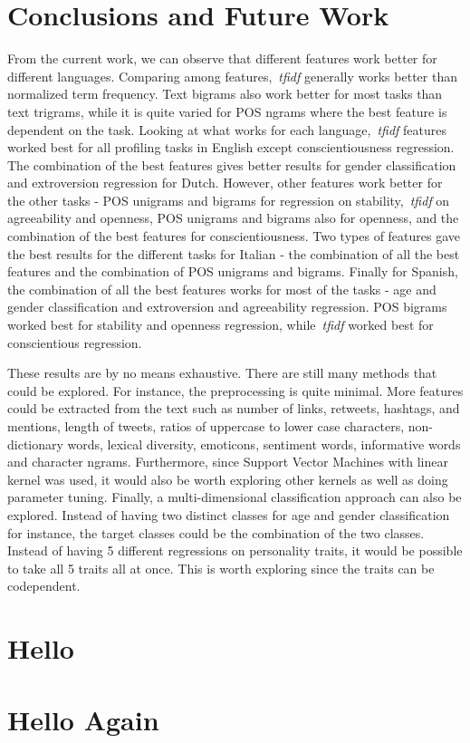 \documentclass[a4paper]{llncs}
\begin{document}
\section{Conclusions and Future Work}
From the current work, we can observe that different features work better for different languages. Comparing among features,~\textit{tfidf} generally works better than normalized term frequency. Text bigrams also work better for most tasks than text trigrams, while it is quite varied for POS ngrams where the best feature is dependent on the task. Looking at what works for each language,~\textit{tfidf} features worked best for all profiling tasks in English except conscientiousness regression. The combination of the best features gives better results for gender classification and extroversion regression for Dutch. However, other features work better for the other tasks - POS unigrams and bigrams for regression on stability,~\textit{tfidf} on agreeability and openness, POS unigrams and bigrams also for openness, and the combination of the best features for conscientiousness. Two types of features gave the best results for the different tasks for Italian - the combination of all the best features and the combination of POS unigrams and bigrams. Finally for Spanish, the combination of all the best features works for most of the tasks - age and gender classification and extroversion and agreeability regression. POS bigrams worked best for stability and openness regression, while~\textit{tfidf} worked best for conscientious regression.

These results are by no means exhaustive. There are still many methods that could be explored. For instance, the preprocessing is quite minimal. More features could be extracted from the text such as number of links, retweets, hashtags, and mentions, length of tweets, ratios of uppercase to lower case characters, non-dictionary words, lexical diversity, emoticons, sentiment words, informative words and character ngrams. Furthermore, since Support Vector Machines with linear kernel was used, it would also be worth exploring other kernels as well as doing parameter tuning. Finally, a multi-dimensional classification approach can also be explored. Instead of having two distinct classes for age and gender classification for instance, the target classes could be the combination of the two classes. Instead of having 5 different regressions on personality traits, it would be possible to take all 5 traits all at once. This is worth exploring since the traits can be codependent. 


\begin{appendices}
\renewcommand{\thesection}{\appendixname~\Alph{section}}
\section{Hello}
\section{Hello Again}
\end{appendices}



\end{document}
